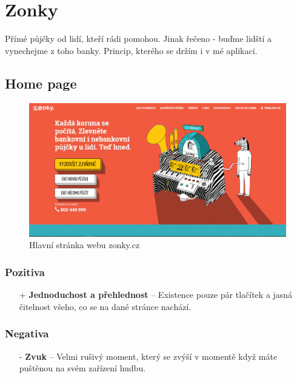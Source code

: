 \section{Zonky}
\label{chap:zonky}

Přímé půjčky od lidí, kteří rádi pomohou. Jinak řečeno - buďme lidští a vynechejme z toho banky. Princip, kterého se držím i v mé aplikaci.

\subsection{Home page}
\begin{figure}[h]
    \centering
    \includegraphics[width=1.0\textwidth]{media/zonky/home.png}
    \caption{Hlavní stránka webu zonky.cz}
    \label{fig:zonky:home}
\end{figure}
\subsubsection*{Pozitiva}
\begin{itemize}
    \item[+] \textbf{Jednoduchost a přehlednost} -- Existence pouze pár tlačítek a jasná čitelnost všeho, co se na dané stránce nachází.
\end{itemize}
\subsubsection*{Negativa}
\begin{itemize}
    \item[-] \textbf{Zvuk} -- Velmi rušivý moment, který se zvýší v momentě když máte puštěnou na svém zařízení hudbu.
\end{itemize}



